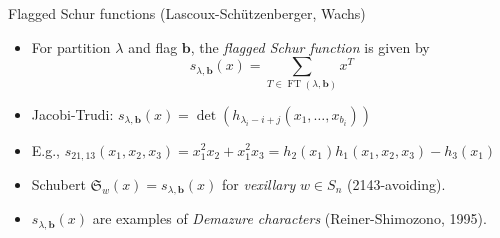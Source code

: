 \documentclass[dvipsnames]{beamer}
\DeclareMathOperator{\FT}{FT}
\newcommand{\bb}{{\mathbf b}}
\theoremstyle{definition}
\newcounter{c}
\begin{document}
\begin{frame}{Flagged Schur functions (Lascoux-Sch\"{u}tzenberger, Wachs)}
  \begin{itemize}
  \item For partition \(\lambda\) and flag \(\bb\), the \emph{flagged
      Schur function} is given by
    \[
      s_{\lambda,\bb}(x) = \sum_{T \in \FT(\lambda,\bb)} x^T
    \]\pause
  \item Jacobi-Trudi: \(s_{\lambda,\bb}(x) = \det(h_{\lambda_i-i+j}(x_1,\ldots,x_{b_i}))\)\pause
  \item E.g., \(s_{21,13}(x_1,x_2,x_3) = x_1^2x_2 + x_1^2 x_3 =
    h_2(x_1)h_1(x_1,x_2,x_3)-h_3(x_1)\) 
    \begin{center}
    \end{center}
    \pause
  \item Schubert \(\mathfrak{S}_w(x) = s_{\lambda,\bb}(x)\) for
    \emph{vexillary} \(w \in S_n\) (2143-avoiding).\pause
  \item \(s_{\lambda,\bb}(x)\) are examples of \emph{Demazure
      characters} (Reiner-Shimozono, 1995).
  \end{itemize}
\end{frame}
\end{document}
